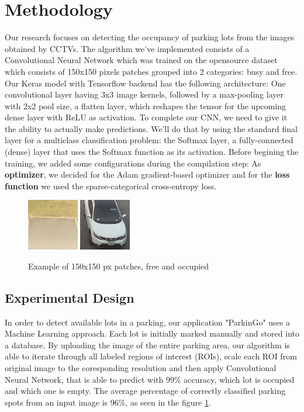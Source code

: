 \documentclass[12pt]{article}
\begin{document}
\section{Methodology}
Our research focuses on detecting the occupancy of parking lots from the images obtained by CCTVs.
The algorithm we've implemented consists of a Convolutional Neural Network which was trained on the opensource 
\cite{cnrpark} dataset which consists of 150x150 pixels patches grouped into 2 categories: busy and free.
Our Keras model with Tensorflow backend has the following architecture: One convolutional layer having 3x3 image kernels,
followed by a max-pooling layer with 2x2 pool size, a flatten layer, which reshapes the tensor for the upcoming dense layer 
with ReLU as activation. To complete our CNN, we need to give it the ability to actually make predictions. 
We’ll do that by using the standard final layer for a multiclass classification problem: 
the Softmax layer, a fully-connected (dense) layer that uses the Softmax function as its activation.
Before begining the training, we added some configurations during the compilation step:
As \textbf{optimizer}, we decided for the Adam gradient-based optimizer and for the \textbf{loss function} 
we used the sparse-categorical cross-entropy loss.

\begin{figure}
\caption{Example of 150x150 px patches, free and occupied}
\includegraphics[width=0.2\textwidth]{20150703_0810_10}
\includegraphics[width=0.2\textwidth]{20150703_0810_45}
\label{fig:resultimg}
\end{figure}


\subsection{Experimental Design}
In order to detect available lots in a parking, our application "ParkinGo" uses a Machine Learning approach.
Each lot is initially marked manually and stored into a database. By uploading the image of the entire parking area,
our algorithm is able to iterate through all labeled regions of interest (ROIs), scale each ROI from original image to the coresponding resolution 
and then apply Convolutional Neural Network, that is able to predict with 99\% accuracy, which lot is occupied and which one is empty.
The average percentage of correctly classified parking spots from an input image is 96\%, as seen in the figure \ref{fig:resultimg}.
\end{document}
